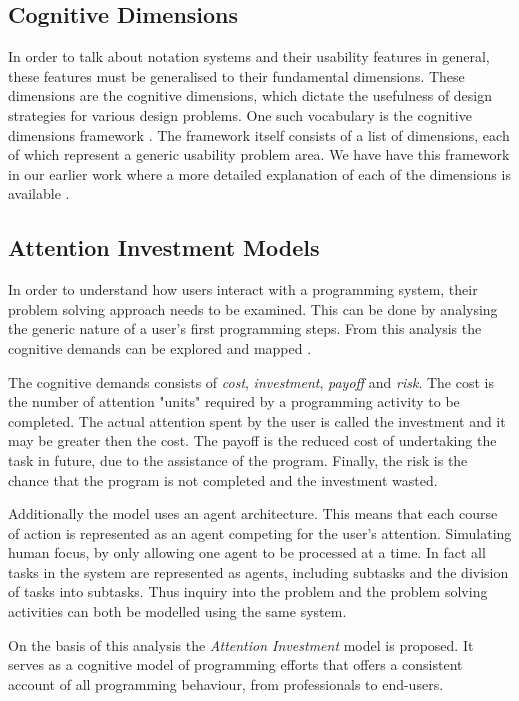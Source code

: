 \subsection{Cognitive Dimensions} \label{sec:cog-dim}
In order to talk about notation systems and their usability features in general, these features must be generalised to their fundamental dimensions. These dimensions are the cognitive dimensions, which dictate the usefulness of design strategies for various design problems. One such vocabulary is the cognitive dimensions framework \cite{green1996usability}. The framework itself consists of a list of dimensions, each of which represent a generic usability problem area.
We have have this framework in our earlier work where a more detailed explanation of each of the dimensions is available \cite{p92018gameplay}.

\subsection{Attention Investment Models} \label{sec:attention-investment}
In order to understand how users interact with a programming system, their problem solving approach needs to be examined. This can be done by analysing the generic nature of a user's first programming steps. From this analysis the cognitive demands can be explored and mapped \cite{blackwell2002first}.

The cognitive demands consists of \textit{cost}, \textit{investment}, \textit{payoff} and \textit{risk}. The cost is the number of attention "units" required by a programming activity to be completed. The actual attention spent by the user is called the investment and it may be greater then the cost. The payoff is the reduced cost of undertaking the task in future, due to the assistance of the program. Finally, the risk is the chance that the program is not completed and the investment wasted.

Additionally the model uses an agent architecture. This means that each course of action is represented as an agent competing for the user's attention. Simulating human focus, by only allowing one agent to be processed at a time. In fact all tasks in the system are represented as agents, including subtasks and the division of tasks into subtasks. Thus inquiry into the problem and the problem solving activities can both be modelled using the same system.

On  the  basis  of  this  analysis  the  \textit{Attention Investment} model is proposed. It serves as a cognitive model of programming efforts that offers a consistent account of all programming behaviour, from professionals to end-users.

